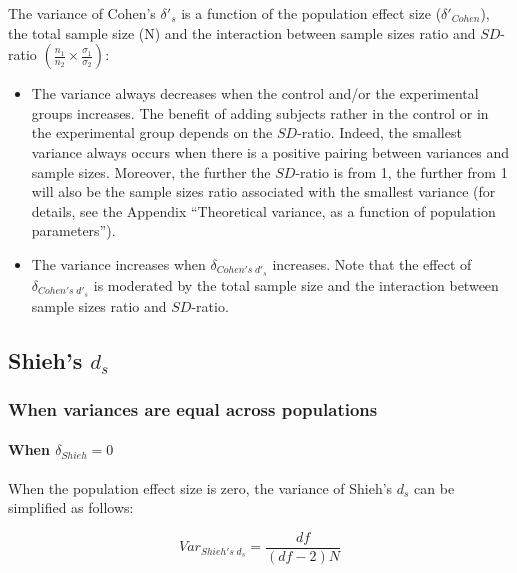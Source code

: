 \documentclass[
  man]{apa6}
\providecommand{\tightlist}{%
  \setlength{\itemsep}{0pt}\setlength{\parskip}{0pt}}
\begin{document}
The variance of Cohen's \(\delta'_s\) is a function of the population effect size (\(\delta'_{Cohen}\)), the total sample size (N) and the interaction between sample sizes ratio and \(SD\)-ratio \(\left(\frac{n_1}{n_2}\times\frac{\sigma_1}{\sigma_2} \right)\):

\begin{itemize}
\tightlist
\item
  The variance always decreases when the control and/or the experimental groups increases. The benefit of adding subjects rather in the control or in the experimental group depends on the \(SD\)-ratio. Indeed, the smallest variance always occurs when there is a positive pairing between variances and sample sizes. Moreover, the further the \(SD\)-ratio is from 1, the further from 1 will also be the sample sizes ratio associated with the smallest variance (for details, see the Appendix \enquote{Theoretical variance, as a function of population parameters}).\\
\item
  The variance increases when \(\delta_{Cohen's \; d'_s}\) increases. Note that the effect of \(\delta_{Cohen's \; d'_s}\) is moderated by the total sample size and the interaction between sample sizes ratio and \(SD\)-ratio.
\end{itemize}

\hypertarget{shiehs-d_s}{%
\subsection{\texorpdfstring{Shieh's \(d_s\)}{Shieh's d\_s}}\label{shiehs-d_s}}

\hypertarget{when-variances-are-equal-across-populations-3}{%
\subsubsection{When variances are equal across populations}\label{when-variances-are-equal-across-populations-3}}

\hypertarget{when-delta_shieh0}{%
\paragraph{\texorpdfstring{When \(\delta_{Shieh}=0\)}{When \textbackslash delta\_\{Shieh\}=0}}\label{when-delta_shieh0}}

When the population effect size is zero, the variance of Shieh's \(d_s\) can be simplified as follows:

\[Var_{Shieh's \; d_s} = \frac{df}{(df-2)N}\]
\end{document}
